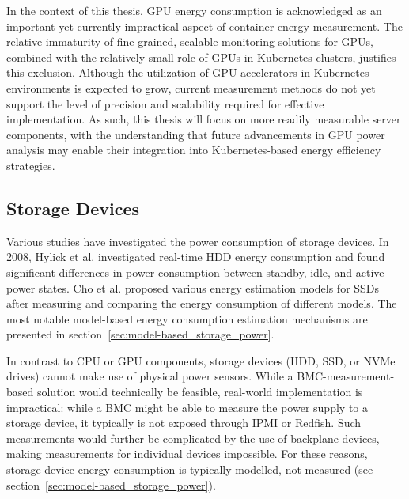 In the context of this thesis, GPU energy consumption is acknowledged as an important yet currently impractical aspect of container energy measurement. The relative immaturity of fine-grained, scalable monitoring solutions for GPUs, combined with the relatively small role of GPUs in Kubernetes clusters, justifies this exclusion. Although the utilization of GPU accelerators in Kubernetes environments is expected to grow, current measurement methods do not yet support the level of precision and scalability required for effective implementation. As such, this thesis will focus on more readily measurable server components, with the understanding that future advancements in GPU power analysis may enable their integration into Kubernetes-based energy efficiency strategies.

\subsection{Storage Devices}

Various studies have investigated the power consumption of storage devices. In 2008, Hylick et al.\parencite{hylickAnalysisHardDrive2008a} investigated real-time HDD energy consumption and found significant differences in power consumption between standby, idle, and active power states. Cho et al.\parencite{choDesignTradeoffsSSDs2015} proposed various energy estimation models for SSDs after measuring and comparing the energy consumption of different models. The most notable model-based energy consumption estimation mechanisms are presented in section~\ref{sec:model-based_storage_power}.

In contrast to CPU or GPU components, storage devices (HDD, SSD, or NVMe drives) cannot make use of physical power sensors. While a BMC-measurement-based solution would technically be feasible, real-world implementation is impractical: while a BMC might be able to measure the power supply to a storage device, it typically is not exposed through IPMI or Redfish. Such measurements would further be complicated by the use of backplane devices, making measurements for individual devices impossible. For these reasons, storage device energy consumption is typically modelled, not measured (see section~\ref{sec:model-based_storage_power}).

